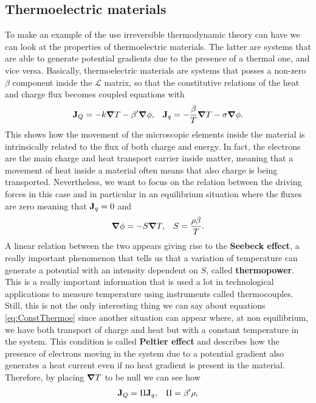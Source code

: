 \subsection{Thermoelectric materials}

To make an example of the use irreversible thermodynamic theory can have we can look at the properties of thermoelectric materials. The latter are systems that are able to generate potential gradients due to the presence of a thermal one, and vice versa. Basically, thermoelectric materials are systems that posses a non-zero $\beta$ component inside the $\mathcal{L}$ matrix, so that the constitutive relations of the heat and charge flux becomes coupled equations with
\begin{align}
    \label{eq:ConstThermoe}
    &\vb{J}_Q = -k\grad T - \beta'\grad \phi, &\vb{J}_q = -\frac{\beta}{T}\grad T - \sigma\grad \phi.
\end{align}
This shows how the movement of the microscopic elements inside the material is intrinsically related to the flux of both charge and energy. In fact, the electrons are the main charge and heat transport carrier inside matter, meaning that a movement of heat inside a material often means that also charge is being transported. Nevertheless, we want to focus on the relation between the driving forces in this case and in particular in an equilibrium situation where the fluxes are zero meaning that $\vb{J}_q = 0$ and
\begin{align}
    &\grad \phi = -S\grad T, &S = \frac{\rho\beta}{T}.
\end{align}
A linear relation between the two appears giving rise to the \textbf{Seebeck effect}, a really important phenomenon that tells us that a variation of temperature can generate a potential with an intensity dependent on $S$, called \textbf{thermopower}. This is a really important information that is used a lot in technological applications to measure temperature using instruments called thermocouples. Still, this is not the only interesting thing we can say about equations \eqref{eq:ConstThermoe} since another situation can appear where, at non equilibrium, we have both transport of charge and heat but with a constant temperature in the system. This condition is called \textbf{Peltier effect} and describes how the presence of electrons moving in the system due to a potential gradient also generates a heat current even if no heat gradient is present in the material. Therefore, by placing $\grad T$ to be null we can see how
\begin{align}
    &\vb{J}_Q = \Pi\vb{J}_q, &\Pi = \beta'\rho,
\end{align}
